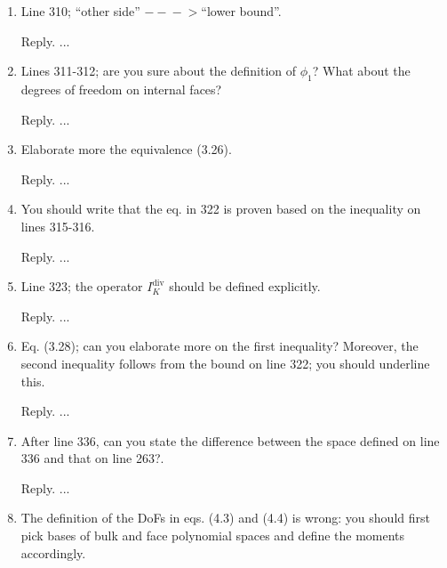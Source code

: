 \documentclass[10pt]{amsart}
\theoremstyle{definition}
\theoremstyle{remark}
\renewcommand{\div}{\operatorname{div}}
\begin{document}
\begin{enumerate}[1.]
\medskip

\item \textsf{Line 310; “other side” $-\!\!\!-\!\!\!-\!\!\!>$“lower bound”.}

\smallskip \noindent \textcolor[rgb]{1.00,0.00,0.00}{Reply.}
...

\medskip

\item \textsf{Lines 311-312; are you sure about the definition of $\phi_1$? What about the degrees of freedom on internal faces?}

\smallskip \noindent \textcolor[rgb]{1.00,0.00,0.00}{Reply.}
...

\medskip

\item \textsf{Elaborate more the equivalence (3.26).}

\smallskip \noindent \textcolor[rgb]{1.00,0.00,0.00}{Reply.}
...

\medskip

\item \textsf{You should write that the eq. in 322 is proven based on the inequality on lines 315-316.}

\smallskip \noindent \textcolor[rgb]{1.00,0.00,0.00}{Reply.}
...

\medskip

\item \textsf{Line 323; the operator $I_K^{\div}$ should be defined explicitly.}

\smallskip \noindent \textcolor[rgb]{1.00,0.00,0.00}{Reply.}
...

\medskip

\item \textsf{Eq. (3.28); can you elaborate more on the first inequality? Moreover, the second inequality follows from the bound on line 322; you should underline this.}

\smallskip \noindent \textcolor[rgb]{1.00,0.00,0.00}{Reply.}
...

\medskip

\item \textsf{After line 336, can you state the difference between the space defined on line 336 and that on line 263?.}

\smallskip \noindent \textcolor[rgb]{1.00,0.00,0.00}{Reply.}
...

\medskip

\item \textsf{The definition of the DoFs in eqs. (4.3) and (4.4) is wrong: you should first pick bases of bulk and face polynomial spaces and define the moments accordingly.}


\end{enumerate}
\end{document}
